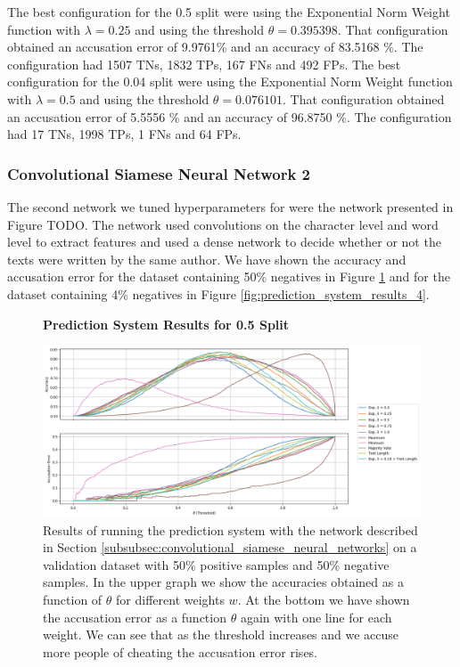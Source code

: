 The best configuration for the 0.5 split were using the Exponential Norm Weight
function with $\lambda = 0.25$ and using the threshold $\theta = 0.395398$.
That configuration obtained an accusation error of 9.9761\% and an accuracy of
83.5168 \%. The configuration had 1507 \gls{TN}s, 1832 \gls{TP}s, 167 \gls{FN}s
and 492 \gls{FP}s. The best configuration for the 0.04 split were using the
Exponential Norm Weight function with $\lambda = 0.5$ and using the threshold
$\theta = 0.076101$. That configuration obtained an accusation error of 5.5556
\% and an accuracy of 96.8750 \%. The configuration had 17 \gls{TN}s, 1998
\gls{TP}s, 1 \gls{FN}s and 64 \gls{FP}s.


\subsubsection{Convolutional Siamese Neural Network 2}

The second network we tuned hyperparameters for were the network presented
in Figure TODO. The network used convolutions on the character level and
word level to extract features and used a dense network to decide whether or
not the texts were written by the same author. We have shown the accuracy
and accusation error for the dataset containing 50\% negatives in Figure
\ref{fig:prediction_system_results_3} and for the dataset containing 4\%
negatives in Figure \ref{fig:prediction_system_results_4}.

\begin{figure}
    \centering
    \textbf{Prediction System Results for 0.5 Split}\par\medskip
    \includegraphics[width=\textwidth]{./pictures/experiments/prediction_system_network6_50.png}
    \caption{Results of running the prediction system with the network described
        in Section \ref{subsubsec:convolutional_siamese_neural_networks} on a
        validation dataset with 50\% positive samples and 50\% negative samples.
        In the upper graph we show the accuracies obtained as a function of
        $\theta$ for different weights $w$. At the bottom we have shown the
        accusation error as a function $\theta$ again with one line for each
        weight. We can see that as the threshold increases and we accuse more
        people of cheating the accusation error rises.}
    \label{fig:prediction_system_results_3}
\end{figure}


